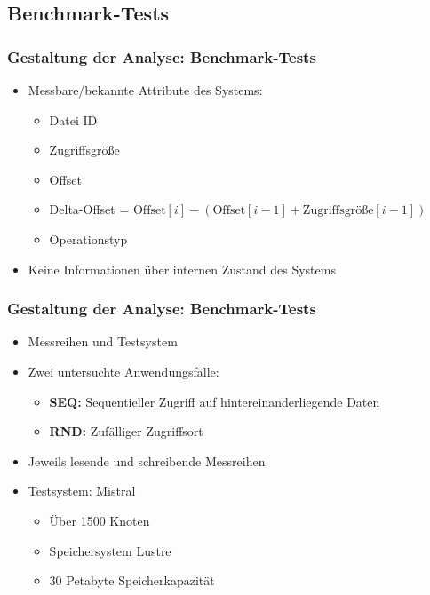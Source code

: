 \documentclass{beamer}
\begin{document}
\subsection{Benchmark-Tests}
\begin{frame}
\frametitle{Gestaltung der Analyse: Benchmark-Tests}
	\begin{itemize}
		\item Messbare/bekannte Attribute des Systems:
		\begin{itemize}
			\item Datei ID
			\item Zugriffsgröße
			\item Offset
			\item Delta-Offset = $\text{Offset}[i]-(\text{Offset}[i-1]+\text{Zugriffsgröße}[i-1])$
			\item Operationstyp 
		\end{itemize}
		\item Keine Informationen über internen Zustand des Systems
	\end{itemize}
\end{frame}

\begin{frame}
\frametitle{Gestaltung der Analyse: Benchmark-Tests}
\begin{itemize}
	\item Messreihen und Testsystem
	\item Zwei untersuchte Anwendungsfälle:
	\begin{itemize}
		\item \textbf{SEQ:} Sequentieller Zugriff auf hintereinanderliegende Daten
		\item \textbf{RND:} Zufälliger Zugriffsort 
	\end{itemize}
	\item Jeweils lesende und schreibende Messreihen
	\item Testsystem: Mistral
	\begin{itemize}
		\item Über 1500 Knoten
		\item Speichersystem Lustre
		\item 30 Petabyte Speicherkapazität
	\end{itemize}
\end{itemize}
\end{frame}
\end{document}
